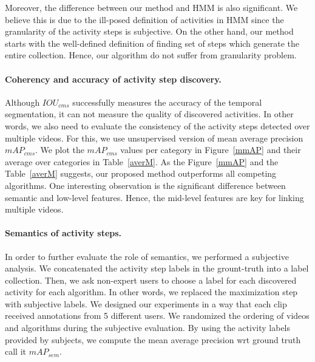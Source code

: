 Moreover, the difference between our method and HMM is also significant. We believe this is due to the ill-posed definition of activities in HMM since the granularity of the activity steps is subjective. On the other hand, our method starts with the well-defined definition of finding set of steps which generate the entire collection. Hence, our algorithm do not suffer from granularity problem.
\begin{table}
\caption{Average of $IOU_{cms}$ and $mAP_{cms}$ over recipes.}
{\small
{}}
\normalsize
\label{averM}
\end{table}

\noindent\paragraph{Coherency and accuracy of activity step discovery.}
Although $IOU_{cms}$ successfully measures the accuracy of the temporal segmentation, it can not measure the quality of discovered activities. In other words, we also need to evaluate the consistency of the activity steps detected over multiple videos. For this, we use unsupervised version of mean average precision $mAP_{cms}$. We plot the $mAP_{cms}$ values per category in Figure~\ref{mmAP} and their average over categories in Table~\ref{averM}. As the Figure~\ref{mmAP} and the Table~\ref{averM} suggests, our proposed method outperforms all competing algorithms. One interesting observation is the significant difference between semantic and low-level features. Hence, the mid-level features are key for linking multiple videos.

\noindent\paragraph{Semantics of activity steps.}
In order to further evaluate the role of semantics, we performed a subjective analysis. We concatenated the activity step labels in the grount-truth into a label collection. Then, we ask non-expert users to choose a label for each discovered activity for each algorithm. In other words, we replaced the maximization step with subjective labels. We designed our experiments in a way that each clip received annotations from 5 different users. We randomized the ordering of videos and algorithms during the subjective evaluation. By using the activity labels provided by subjects, we compute the mean average precision wrt ground truth call it $mAP_{sem}$. 

